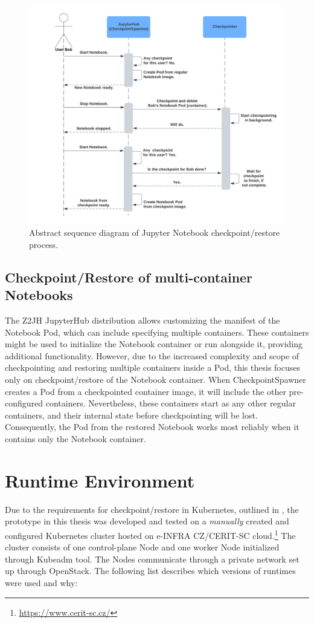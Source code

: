 \documentclass[
  digital,     %
  oneside,     %
  nosansbold,  %
  nocolorbold, %
  lof,         %
  nolot,         %
]{fithesis4}
\begin{document}
\begin{figure}[H]
  \begin{center}
  \includegraphics[width=\textwidth]{figures/checkpoint-highlevel.png}
  \end{center}
  \caption{Abstract sequence diagram of Jupyter Notebook checkpoint/restore process.}
  \label{fig:checkpoint-highlevel}
\end{figure}

\subsection{Checkpoint/Restore of multi-container Notebooks}
The Z2JH JupyterHub distribution allows customizing the manifest of the Notebook Pod, which can include specifying multiple containers. These containers might be used to initialize the Notebook container or run alongside it, providing additional functionality. However, due to the increased complexity and scope of checkpointing and restoring multiple containers inside a Pod, this thesis focuses only on checkpoint/restore of the Notebook container. When CheckpointSpawner creates a Pod from a checkpointed container image, it will include the other pre-configured containers. Nevertheless, these containers start as any other regular containers, and their internal state before checkpointing will be lost. Consequently, the Pod from the restored Notebook works most reliably when it contains only the Notebook container.


\section{Runtime Environment}
\label{sec:runtime-env}
Due to the requirements for checkpoint/restore in Kubernetes, outlined in , the prototype in this thesis was developed and tested on a \emph{manually} created and configured Kubernetes cluster hosted on e-INFRA CZ/CERIT-SC cloud.\footnote{\url{https://www.cerit-sc.cz/}} The cluster consists of one control-plane Node and one worker Node initialized through Kubeadm tool. The Nodes communicate through a private network set up through OpenStack. The following list describes which versions of runtimes were used and why:
\end{document}
